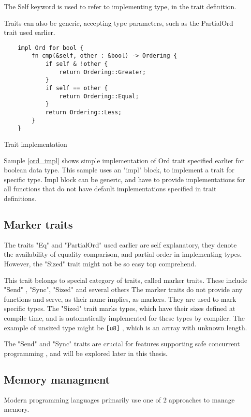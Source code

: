 The Self keyword is used to refer to implementing type, in the trait definition.

Traits can also be generic, accepting type parameters, such as the PartialOrd trait used earlier.

\begin{listing}[H]
\begin{verbatim}
    impl Ord for bool {
        fn cmp(&self, other : &bool) -> Ordering {
            if self & !other {
                return Ordering::Greater;
            }
            if self == other {
                return Ordering::Equal;
            }
            return Ordering::Less;
        }
    }
\end{verbatim}
\label{ord_impl}
\caption{Trait implementation}
\end{listing}

Sample \ref{ord_impl} shows simple implementation of Ord trait specified earlier for boolean data type. This sample
uses an "impl" block, to implement a trait for specific type. Impl block can be generic, and have to provide
implementations for all functions that do not have default implementations specified in trait definitions.

\subsection{Marker traits}
The traits "Eq" and "PartialOrd" used earlier are self explanatory, they denote the availability of equality comparison, and partial order
in implementing types. However, the "Sized" trait might not be so easy top comprehend.

This trait belongs to special category of traits, called marker traits. These include "Send" , "Sync", "Sized" and several others
The marker traits do not provide any functions and serve, as their name implies, as markers. They are used to mark specific
types. The "Sized" trait marks types, which have their sizes defined at compile time, and is automatically implemented
for these types by compiler. The example of unsized type might be \verb|[u8]| , which is an arrray with unknown length.

The "Send" and "Sync" traits are crucial for features supporting safe concurrent programming , and will be explored later in
this thesis.
\subsection{Memory managment}
Modern programming languages primarily use one of 2 approaches to manage memory.

